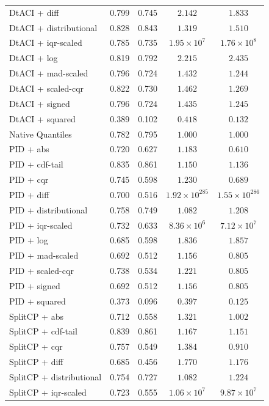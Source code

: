 \begin{longtable}{lcccc}
	DtACI + diff & 0.799 & 0.745 & $2.142$ & $1.833$ \\
	DtACI + distributional & 0.828 & 0.843 & $1.319$ & $1.510$ \\
	DtACI + iqr-scaled & 0.785 & 0.735 & $1.95 \times 10^{7}$ & $1.76 \times 10^{8}$ \\
	DtACI + log & 0.819 & 0.792 & $2.215$ & $2.435$ \\
	DtACI + mad-scaled & 0.796 & 0.724 & $1.432$ & $1.244$ \\
	DtACI + scaled-cqr & 0.822 & 0.730 & $1.462$ & $1.269$ \\
	DtACI + signed & 0.796 & 0.724 & $1.435$ & $1.245$ \\
	DtACI + squared & 0.389 & 0.102 & $0.418$ & $0.132$ \\
	Native Quantiles & 0.782 & 0.795 & $1.000$ & $1.000$ \\
	PID + abs & 0.720 & 0.627 & $1.183$ & $0.610$ \\
	PID + cdf-tail & 0.835 & 0.861 & $1.150$ & $1.136$ \\
	PID + cqr & 0.745 & 0.598 & $1.230$ & $0.689$ \\
	PID + diff & 0.700 & 0.516 & $1.92 \times 10^{285}$ & $1.55 \times 10^{286}$ \\
	PID + distributional & 0.758 & 0.749 & $1.082$ & $1.208$ \\
	PID + iqr-scaled & 0.732 & 0.633 & $8.36 \times 10^{6}$ & $7.12 \times 10^{7}$ \\
	PID + log & 0.685 & 0.598 & $1.836$ & $1.857$ \\
	PID + mad-scaled & 0.692 & 0.512 & $1.156$ & $0.805$ \\
	PID + scaled-cqr & 0.738 & 0.534 & $1.221$ & $0.805$ \\
	PID + signed & 0.692 & 0.512 & $1.156$ & $0.805$ \\
	PID + squared & 0.373 & 0.096 & $0.397$ & $0.125$ \\
	SplitCP + abs & 0.712 & 0.558 & $1.321$ & $1.002$ \\
	SplitCP + cdf-tail & 0.839 & 0.861 & $1.167$ & $1.151$ \\
	SplitCP + cqr & 0.757 & 0.549 & $1.384$ & $0.910$ \\
	SplitCP + diff & 0.685 & 0.456 & $1.770$ & $1.176$ \\
	SplitCP + distributional & 0.754 & 0.727 & $1.082$ & $1.224$ \\
	SplitCP + iqr-scaled & 0.723 & 0.555 & $1.06 \times 10^{7}$ & $9.87 \times 10^{7}$ \\

\end{longtable}
